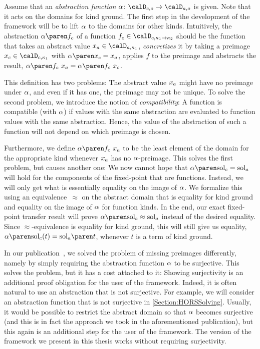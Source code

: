 \documentclass[../../diss.tex]{subfiles}
\begin{document}
Assume that an \emph{abstraction function} $\abs \colon \domainc{\ground} \to \domaina{\ground}$ is given.
Note that it acts on the domains for kind ground.
The first step in the development of the framework will be to lift $\abs$ to the domains for other kinds.
Intuitively, the abstraction $\abs{\fc}$ of a function $\fc \in \domainc{\kappa_1 \to \kappa_2}$ should be the function that takes an abstract value $\xa \in \domaina{\kappa_1}$, \emph{concretizes} it by taking a preimage $\xc \in \domainc{\kappa_1}$ with $\abs{\xc} = \xa$, applies $f$ to the preimage and abstracts the result, $\abs{\fc} \appl \xa = \abs{\fc \appl \xc}$.

This definition has two problems:
The abstract value $x_a$ might have no preimage under $\abs$, and even if it has one, the preimage may not be unique.
To solve the second problem, we introduce the notion of \emph{compatibility}:
A function is compatible (with $\abs$) if values with the same abstraction are evaluated to function values with the same abstraction.
Hence, the value of the abstraction of such a function will not depend on which preimage is chosen.

Furthermore, we define $\abs{\fc} \appl \xa$ to be the least element of the domain for the appropriate kind whenever $x_a$ has no $\abs$-preimage.
This solves the first problem, but causes another one:
We now cannot hope that $\abs{\solc} = \sola$ will hold for the components of the fixed-point that are functions.
Instead, we will only get what is essentially equality on the image of $\abs$.
We formalize this using an equivalence~$\approx$ on the abstract domain that is equality for kind ground and equality on the image of $\abs$ for function kinds.
In the end, our exact fixed-point transfer result will prove $\abs{\solc} \approx \sola$ instead of the desired equality.
Since $\approx$-equivalence is equality for kind ground, this will still give us equality, $\abs{\solc}(t) = \sola{t}$, whenever $t$ is a term of kind ground.

\begin{remark*}
    In our publication~\cite{HagueMM17}, we solved the problem of missing preimages differently, namely by simply requiring the abstraction function $\abs$ to be surjective.
    This solves the problem, but it has a cost attached to it:
    Showing surjectivity is an additional proof obligation for the user of the framework.
    Indeed, it is often natural to use an abstraction that is not surjective.
    For example, we will consider an abstraction function that is not surjective in \cref{Section:HORSSolving}.
    Usually, it would be possible to restrict the abstract domain so that $\abs$ becomes surjective (and this is in fact the approach we took in the aforementioned publication), but this again is an additional step for the user of the framework.
    The version of the framework we present in this thesis works without requiring surjectivity.
\end{remark*}
\end{document}
